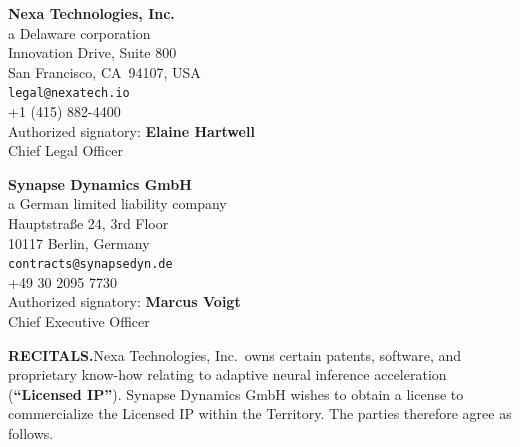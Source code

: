 \documentclass[11pt,a4paper]{article}
\newcommand{\defterm}[1]{\textbf{\color{NexaNavy}``#1''}}
\begin{document}
\noindent
\begin{minipage}[t]{0.475\textwidth}
\begin{tcolorbox}[partystyle, title={\faBuilding\enspace Licensor}]
  \textbf{\color{NexaNavy}Nexa Technologies, Inc.}\\[3pt]
  {\small\color{NexaMuted}a Delaware corporation}\\[6pt]
  \faMapMarker{} Innovation Drive, Suite 800\\
  \hphantom{\faMapMarker\enspace}San Francisco, CA\ 94107, USA\\[4pt]
  \faEnvelope\enspace \texttt{legal@nexatech.io}\\[4pt]
  \faPhone\enspace +1 (415) 882-4400\\[4pt]
  \faPen\enspace Authorized signatory: \textbf{Elaine Hartwell}\\
  \hphantom{\faPen\enspace}Chief Legal Officer
\end{tcolorbox}
\end{minipage}%
\hfill
\begin{minipage}[t]{0.475\textwidth}
\begin{tcolorbox}[partystyle, title={\faBuilding\enspace Licensee}]
  \textbf{\color{NexaNavy}Synapse Dynamics GmbH}\\[3pt]
  {\small\color{NexaMuted}a German limited liability company}\\[6pt]
  \faMapMarker\enspace Hauptstra{\ss}e 24, 3rd Floor\\
  \hphantom{\faMapMarker\enspace}10117 Berlin, Germany\\[4pt]
  \faEnvelope\enspace \texttt{contracts@synapsedyn.de}\\[4pt]
  \faPhone\enspace +49 30 2095 7730\\[4pt]
  \faPen\enspace Authorized signatory: \textbf{Marcus Voigt}\\
  \hphantom{\faPen\enspace}Chief Executive Officer
\end{tcolorbox}
\end{minipage}

\vspace{12pt}

\begin{tcolorbox}[warnstyle]
  \small\color{NexaText}%
  \textbf{RECITALS.}\enspace Nexa Technologies, Inc.\ owns certain patents, software, and
  proprietary know-how relating to adaptive neural inference acceleration (\defterm{Licensed IP}).
  Synapse Dynamics GmbH wishes to obtain a license to commercialize the Licensed IP within the
  Territory. The parties therefore agree as follows.
\end{tcolorbox}
\end{document}
